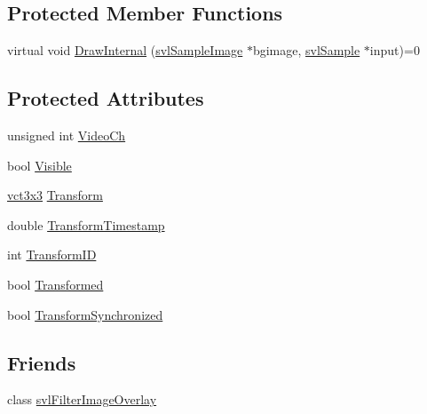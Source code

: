 \subsection*{Protected Member Functions}
\begin{DoxyCompactItemize}
\item 
virtual void \hyperlink{classsvl_overlay_a6e6e5650596284a59be75be7dc073cd2}{Draw\-Internal} (\hyperlink{classsvl_sample_image}{svl\-Sample\-Image} $\ast$bgimage, \hyperlink{classsvl_sample}{svl\-Sample} $\ast$input)=0
\end{DoxyCompactItemize}
\subsection*{Protected Attributes}
\begin{DoxyCompactItemize}
\item 
unsigned int \hyperlink{classsvl_overlay_a3cb587204bc369c7f692d0db7cb74e72}{Video\-Ch}
\item 
bool \hyperlink{classsvl_overlay_a9cdf3aba60b4c4a291a5adc1c1cba139}{Visible}
\item 
\hyperlink{vct_fixed_size_matrix_types_8h_aac4a419dacf9282410675d42ebc86a7c}{vct3x3} \hyperlink{classsvl_overlay_aec4ed3a91cfa3ef0012587ac32f8e967}{Transform}
\item 
double \hyperlink{classsvl_overlay_a5b67a9b8184c00fd1f1eddf10714efc0}{Transform\-Timestamp}
\item 
int \hyperlink{classsvl_overlay_a1e0977a50e855ca752620d65907930c2}{Transform\-I\-D}
\item 
bool \hyperlink{classsvl_overlay_a1cc57b52eed3186e7a71b9611e9562cf}{Transformed}
\item 
bool \hyperlink{classsvl_overlay_aa963847ea083493fc20a7a1c9031c478}{Transform\-Synchronized}
\end{DoxyCompactItemize}
\subsection*{Friends}
\begin{DoxyCompactItemize}
\item 
class \hyperlink{classsvl_overlay_a83f118ae07b7352f907d08378ed1e2a8}{svl\-Filter\-Image\-Overlay}
\end{DoxyCompactItemize}


